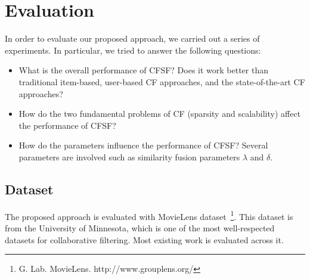 \section{Evaluation}\label{sec:evaluation}

In order to evaluate our proposed approach, we carried out a series of experiments. In particular, we tried to answer the following questions:

\begin{itemize}
  \item What is the overall performance of CFSF? Does it work better than traditional item-based, user-based CF approaches, and the state-of-the-art CF approaches?
  \item How do the two fundamental problems of CF (sparsity and scalability) affect the performance of CFSF?
  \item How do the parameters influence the performance of CFSF? Several parameters are involved such as similarity fusion parameters $\lambda$ and $\delta$.
\end{itemize}

\subsection{Dataset}
The proposed approach is evaluated with MovieLens dataset~\footnote{G. Lab. MovieLens. http://www.grouplens.org/}. This dataset is from the University of Minnesota, which is one of the most well-respected datasets for collaborative filtering. Most existing work is evaluated across it.

